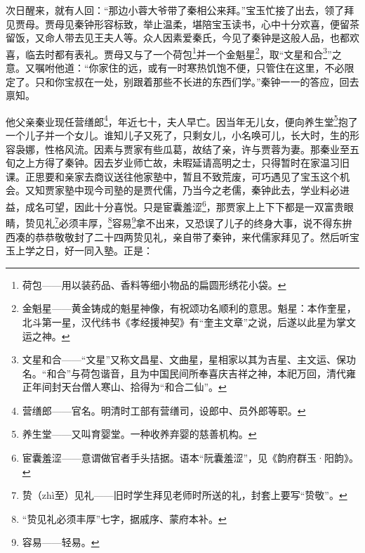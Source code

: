 \par 次日醒来，就有人回：“那边小蓉大爷带了秦相公来拜。”宝玉忙接了出去，领了拜见贾母。贾母见秦钟形容标致，举止温柔，堪陪宝玉读书，心中十分欢喜，便留茶留饭，又命人带去见王夫人等。众人因素爱秦氏，今见了秦钟是这般人品，也都欢喜，临去时都有表礼。贾母又与了一个荷包\footnote{荷包——用以装药品、香料等细小物品的扁圆形绣花小袋。}并一个金魁星\footnote{金魁星——黄金铸成的魁星神像，有祝颂功名顺利的意思。魁星：本作奎星，北斗第一星，汉代纬书《孝经援神契》有“奎主文章”之说，后遂以此星为掌文运之神。}，取“文星和合\footnote{文星和合——“文星”又称文昌星、文曲星，星相家以其为吉星、主文运、保功名。“和合”与荷包谐音，且为中国民间所奉喜庆吉祥之神，本祀万回，清代雍正年间封天台僧人寒山、拾得为“和合二仙”。}”之意。又嘱咐他道：“你家住的远，或有一时寒热饥饱不便，只管住在这里，不必限定了。只和你宝叔在一处，别跟着那些不长进的东西们学。”秦钟一一的答应，回去禀知。
\par 他父亲秦业现任营缮郎\footnote{营缮郎——官名。明清时工部有营缮司，设郎中、员外郎等职。}，年近七十，夫人早亡。因当年无儿女，便向养生堂\footnote{养生堂——又叫育婴堂。一种收养弃婴的慈善机构。}抱了一个儿子并一个女儿。谁知儿子又死了，只剩女儿，小名唤可儿，长大时，生的形容袅娜，性格风流。因素与贾家有些瓜葛，故结了亲，许与贾蓉为妻。那秦业至五旬之上方得了秦钟。因去岁业师亡故，未暇延请高明之士，只得暂时在家温习旧课。正思要和亲家去商议送往他家塾中，暂且不致荒废，可巧遇见了宝玉这个机会。又知贾家塾中现今司塾的是贾代儒，乃当今之老儒，秦钟此去，学业料必进益，成名可望，因此十分喜悦。只是宦囊羞涩\footnote{宦囊羞涩——意谓做官者手头拮据。语本“阮囊羞涩”，见《韵府群玉·阳韵》。}，那贾家上上下下都是一双富贵眼睛，贽见礼\footnote{贽（zhì至）见礼——旧时学生拜见老师时所送的礼，封套上要写“贽敬”。}必须丰厚，\footnote{“贽见礼必须丰厚”七字，据戚序、蒙府本补。}容易\footnote{容易——轻易。}拿不出来，又恐误了儿子的终身大事，说不得东拚西凑的恭恭敬敬封了二十四两贽见礼，亲自带了秦钟，来代儒家拜见了。然后听宝玉上学之日，好一同入塾。正是：




